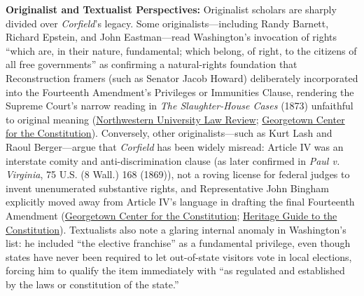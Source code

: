 \documentclass[12pt]{article}
\begin{document}
\textbf{Originalist and Textualist Perspectives:} Originalist scholars are sharply divided over \textit{Corfield}'s legacy. Some originalists---including Randy Barnett, Richard Epstein, and John Eastman---read Washington's invocation of rights ``which are, in their nature, fundamental; which belong, of right, to the citizens of all free governments'' as confirming a natural-rights foundation that Reconstruction framers (such as Senator Jacob Howard) deliberately incorporated into the Fourteenth Amendment's Privileges or Immunities Clause, rendering the Supreme Court's narrow reading in \textit{The Slaughter-House Cases} (1873) unfaithful to original meaning (\href{https://scholarlycommons.law.northwestern.edu/cgi/viewcontent.cgi?article=1181&context=nulr}{Northwestern University Law Review}; \href{https://www.law.georgetown.edu/constitution-center/constitution/state-action/}{Georgetown Center for the Constitution}). Conversely, other originalists---such as Kurt Lash and Raoul Berger---argue that \textit{Corfield} has been widely misread: Article IV was an interstate comity and anti-discrimination clause (as later confirmed in \textit{Paul v. Virginia}, 75 U.S. (8 Wall.) 168 (1869)), not a roving license for federal judges to invent unenumerated substantive rights, and Representative John Bingham explicitly moved away from Article IV's language in drafting the final Fourteenth Amendment (\href{https://www.law.georgetown.edu/constitution-center/constitution/state-action/}{Georgetown Center for the Constitution}; \href{https://constitution.heritage.org/essays/a4-s2-c1/}{Heritage Guide to the Constitution}). Textualists also note a glaring internal anomaly in Washington's list: he included ``the elective franchise'' as a fundamental privilege, even though states have never been required to let out-of-state visitors vote in local elections, forcing him to qualify the item immediately with ``as regulated and established by the laws or constitution of the state.''
\end{document}
